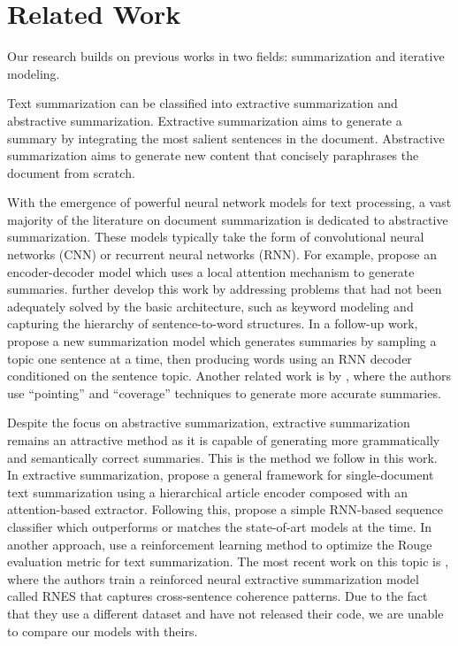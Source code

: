\documentclass[11pt,a4paper]{article}
\begin{document}
 
\section{Related Work}

Our research builds on previous works in two fields: summarization and iterative modeling.

Text summarization can be classified into extractive summarization and abstractive summarization. Extractive summarization aims to generate a summary by integrating the most salient sentences in the document. Abstractive summarization aims to generate new content that concisely paraphrases the document from scratch.

With the emergence of powerful neural network models for text processing, a vast majority of the literature on document summarization is dedicated to abstractive summarization. These models typically take the form of convolutional neural networks (CNN) or recurrent neural networks (RNN).
For example, \citet{Rush2015A} propose an encoder-decoder model which uses a local attention mechanism to generate summaries.
\citet{Nallapati2016Abstractive} further develop this work by addressing problems that had not been adequately solved by the basic architecture, such as keyword modeling and capturing the hierarchy of sentence-to-word structures.
In a follow-up work, \citet{Nallapati2017SenGen} propose a new summarization model which generates summaries by sampling a topic one sentence at a time, then producing words using an RNN decoder conditioned on the sentence topic. 
Another related work is by \citet{DBLP:journals/corr/SeeLM17}, where the authors use ``pointing'' and ``coverage'' techniques to generate more accurate summaries.

Despite the focus on abstractive summarization, extractive summarization remains an attractive method as it is capable of generating more grammatically and semantically correct summaries. This is the method we follow in this work. 
In extractive summarization,
\citet{Cheng2016Neural} propose a general framework for single-document text summarization using a hierarchical article encoder composed with an attention-based extractor. 
Following this, \citet{Nallapati2016SummaRuNNer} propose a simple RNN-based sequence classifier which outperforms or matches the state-of-art models at the time. 
In another approach, \citet{Narayan2018Ranking} use a reinforcement learning method to optimize the Rouge evaluation metric for text summarization.
The most recent work on this topic is \cite{wu2018learning}, where the authors train a reinforced neural extractive summarization model called RNES that captures cross-sentence coherence patterns. Due to the fact that they use a different dataset and have not released their code, we are unable to compare our models with theirs.
\end{document}
